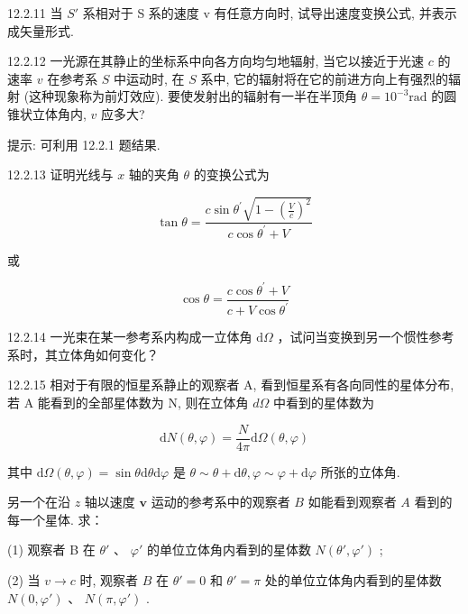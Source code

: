 \begin{problem}{12.2.11}
当 $S'$ 系相对于 S 系的速度 v 有任意方向时, 试导出速度变换公式, 并表示成矢量形式.
\end{problem}
\clearpage


\begin{problem}{12.2.12}
一光源在其静止的坐标系中向各方向均匀地辐射, 当它以接近于光速 $c$ 的速率 $v$ 在参考系 $S$ 中运动时, 在 $S$ 系中, 它的辐射将在它的前进方向上有强烈的辐射 (这种现象称为前灯效应). 要使发射出的辐射有一半在半顶角 $\theta = 10^{-3} \mathrm{rad}$ 的圆锥状立体角内, $v$ 应多大?

提示: 可利用 12.2.1 题结果.
\end{problem}
\clearpage


\begin{problem}{12.2.13}
证明光线与 $x$ 轴的夹角 $\theta$ 的变换公式为

\[
\tan \theta = \frac {c \sin \theta^ {\prime} \sqrt {1 - \left(\frac {V}{c}\right) ^ {2}}}{c \cos \theta^ {\prime} + V}
\]

或

\[
\cos \theta = \frac {c \cos \theta^ {\prime} + V}{c + V \cos \theta^ {\prime}}
\]
\end{problem}
\clearpage


\begin{problem}{12.2.14}
一光束在某一参考系内构成一立体角 $\mathrm{d}\Omega$ ，试问当变换到另一个惯性参考系时，其立体角如何变化？
\end{problem}
\clearpage


\begin{problem}{12.2.15}
相对于有限的恒星系静止的观察者 A, 看到恒星系有各向同性的星体分布, 若 A 能看到的全部星体数为 N, 则在立体角 $d\Omega$ 中看到的星体数为

\[
\mathrm{d} N (\theta , \varphi) = \frac {N}{4 \pi} \mathrm{d} \Omega (\theta , \varphi)
\]

其中 $\mathrm{d}\Omega (\theta ,\varphi) = \sin \theta \mathrm{d}\theta \mathrm{d}\varphi$ 是 $\theta \sim \theta +\mathrm{d}\theta ,\varphi \sim \varphi +\mathrm{d}\varphi$ 所张的立体角.

另一个在沿 $z$ 轴以速度 $\bm{v}$ 运动的参考系中的观察者 $B$ 如能看到观察者 $A$ 看到的每一个星体. 求：

(1) 观察者 B 在 $\theta'$ 、 $\varphi'$ 的单位立体角内看到的星体数 $N(\theta', \varphi')$ ;

(2) 当 $v \to c$ 时, 观察者 $B$ 在 $\theta' = 0$ 和 $\theta' = \pi$ 处的单位立体角内看到的星体数 $N(0, \varphi')$ 、 $N(\pi, \varphi')$ .
\end{problem}
\clearpage


